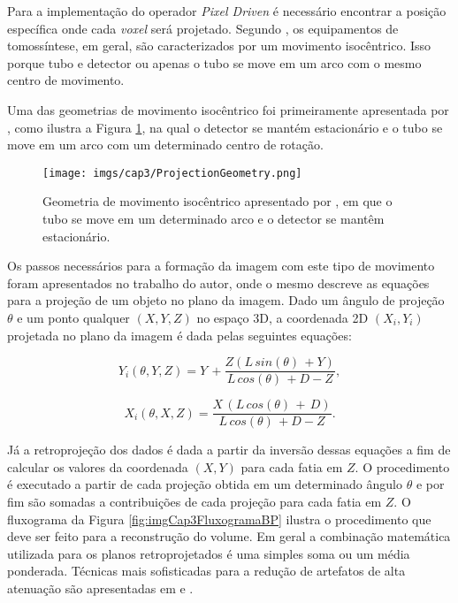 Para a implementação do operador \textit{Pixel Driven} é necessário encontrar a posição específica onde cada \textit{voxel} será projetado. Segundo , os equipamentos de tomossíntese, em geral, são caracterizados por um movimento isocêntrico. Isso porque tubo e detector ou apenas o tubo se move em um arco com o mesmo centro de movimento. 

Uma das geometrias de movimento isocêntrico foi primeiramente apresentada por , como ilustra a Figura \ref{fig:imgCap3ProjectionGeometry}, na qual o detector se mantém estacionário e o tubo se move em um arco com um determinado centro de rotação. 

\begin{figure}[H]
	\caption{Geometria de movimento isocêntrico apresentado por , em que o tubo se move em um determinado arco e o detector se mantêm estacionário.}
	\begin{center}
		\texttt{[image: imgs/cap3/ProjectionGeometry.png]}
	\end{center}
	\label{fig:imgCap3ProjectionGeometry}
\end{figure}

Os passos necessários para a formação da imagem com este tipo de movimento foram apresentados no trabalho do autor, onde o mesmo descreve as equações para a projeção de um objeto no plano da imagem. Dado um ângulo de projeção $\theta$ e um ponto qualquer $(X,Y,Z)$ no espaço \acs{3D}, a coordenada \acs{2D} $(X_{i},Y_{i})$ projetada no plano da imagem é dada pelas seguintes equações:

\begin{equation}
Y_{i}(\theta,Y,Z) = Y \, + \dfrac{ Z(L \, sin(\theta) \, + Y)}{L \, cos(\theta) \, + D - Z},
\label{eq:eqCap3ProjectionY}
\end{equation} 

\begin{equation}
X_{i}(\theta,X,Z) = \dfrac{X \, (L \, cos(\theta)\,+\, D)}{L \, cos(\theta) \, + D - Z}.
\label{eq:eqCap3ProjectionX}
\end{equation} 

Já a retroprojeção dos dados é dada a partir da inversão dessas equações a fim de calcular os valores da coordenada $(X,Y)$ para cada fatia em $Z$. O procedimento é executado a partir de cada projeção obtida em um determinado ângulo $\theta$ e por fim são somadas a contribuições de cada projeção para cada fatia em $Z$. O fluxograma da Figura \ref{fig:imgCap3FluxogramaBP} ilustra o procedimento que deve ser feito para a reconstrução do volume. Em geral a combinação matemática utilizada para os planos retroprojetados é uma simples soma ou um média ponderada. Técnicas mais sofisticadas para a redução de artefatos de alta atenuação são apresentadas em  e .


